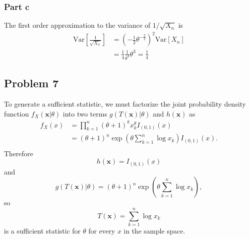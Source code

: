 \documentclass{article}
\begin{document}
\subsubsection*{Part c}
The first order approximation to the variance of $1/\sqrt{X_n}$ is 
\[\begin{aligned}
\text{Var}\left[\frac{1}{\sqrt{X_n}}\right] &= \left(-\frac{1}{2}\theta^{-\frac{3}{2}}\right)^2\text{Var}\left[X_n\right] \\
&= \frac{1}{4}\frac{1}{\theta^3}\theta^3 = \frac{1}{4}
\end{aligned}\]
\subsection*{Problem 7}
To generate a sufficient statistic, we must factorize the joint probability density function
$f_X(\mathbf{x}|\theta)$ into two terms $g(T(\mathbf{x})|\theta)$ and $h(\mathbf{x})$ as 
\[\begin{aligned}
f_X(x) &= \prod_{k=1}^n(\theta+1)^kx_k^\theta I_{(0,1)}(x) \\
&= (\theta+1)^n \exp\left(\theta\sum_{k=1}^n \log{x_k}\right) I_{(0,1)}(x).\\
\end{aligned}\]
Therefore 
\[h(\mathbf{x}) = I_{(0,1)}(x)\]
and 
\[g(T(\mathbf{x})|\theta) = (\theta+1)^n \exp\left(\theta\sum_{k=1}^n \log{x_k}\right),\]
so 
\[T(\mathbf{x}) = \sum_{k=1}^n \log{x_k}\]
is a sufficient statistic for $\theta$ for every $x$ in the sample space. 

 
\end{document}

